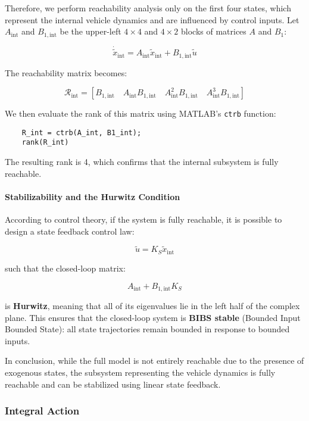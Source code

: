 \documentclass[]{report}
\begin{document}
Therefore, we perform reachability analysis only on the first four states, which represent the internal vehicle dynamics and are influenced by control inputs. Let $A_{\text{int}}$ and $B_{1, \text{int}}$ be the upper-left $4 \times 4$ and $4 \times 2$ blocks of matrices $A$ and $B_1$:

\[
\dot{\tilde{x}}_{\text{int}} = A_{\text{int}} \tilde{x}_{\text{int}} + B_{1,\text{int}} \tilde{u}
\]

The reachability matrix becomes:

\[
\mathcal{R}_{\text{int}} = \left[ B_{1,\text{int}} \quad A_{\text{int}}B_{1,\text{int}} \quad A_{\text{int}}^2B_{1,\text{int}} \quad A_{\text{int}}^3B_{1,\text{int}} \right]
\]

We then evaluate the rank of this matrix using MATLAB's \texttt{ctrb} function:

\begin{verbatim}
	R_int = ctrb(A_int, B1_int);
	rank(R_int)
\end{verbatim}

The resulting rank is 4, which confirms that the internal subsystem is fully reachable.

\paragraph{Stabilizability and the Hurwitz Condition}

According to control theory, if the system is fully reachable, it is possible to design a state feedback control law:

\[
\tilde{u} = K_S \tilde{x}_{\text{int}}
\]

such that the closed-loop matrix:

\[
A_{\text{int}} + B_{1,\text{int}} K_S
\]

is \textbf{Hurwitz}, meaning that all of its eigenvalues lie in the left half of the complex plane. This ensures that the closed-loop system is \textbf{BIBS stable} (Bounded Input Bounded State): all state trajectories remain bounded in response to bounded inputs.

In conclusion, while the full model is not entirely reachable due to the presence of exogenous states, the subsystem representing the vehicle dynamics is fully reachable and can be stabilized using linear state feedback.


\subsubsection{Integral Action}
\end{document}
